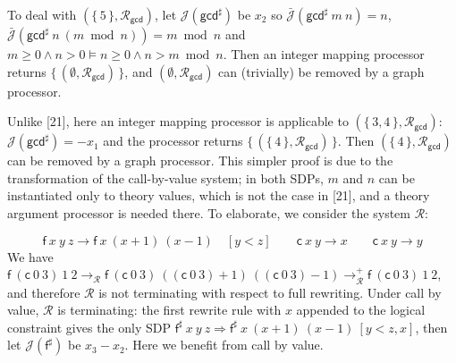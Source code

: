  
 
 
To deal with $(\{\,\text{5}\,\},\mathcal{R}_{\mathsf{gcd}})$, let $\mathcal{J}(\mathsf{gcd}^{\sharp})$ be $x_{2}$ so $\bar{\mathcal{J}}({{\mathsf{gcd}^{\sharp}}\ {m}}\ {n})=n$, $\bar{\mathcal{J}}({{\mathsf{gcd}^{\sharp}}\ {n}}\ {(m\bmod n)})=m\bmod n$ and $m\geq 0\wedge n>0\models n\geq 0\wedge n>m\bmod n$. Then an integer mapping processor returns $\{\,(\emptyset,\mathcal{R}_{\mathsf{gcd}})\,\}$, and $(\emptyset,\mathcal{R}_{\mathsf{gcd}})$ can (trivially) be removed by a graph processor.\par
 
 
 
Unlike [21], here an integer mapping processor is applicable to $(\{\,\text{3},\text{4}\,\},\mathcal{R}_{\mathsf{gcd}})$: $\mathcal{J}(\mathsf{gcd}^{\sharp})={-x_{1}}$ and the processor returns $\{\,(\{\,\text{4}\,\},\mathcal{R}_{\mathsf{gcd}})\,\}$. Then $(\{\,\text{4}\,\},\mathcal{R}_{\mathsf{gcd}})$ can be removed by a graph processor. This simpler proof is due to the transformation of the call-by-value system; in both SDPs, $m$ and $n$ can be instantiated only to theory values, which is not the case in [21], and a theory argument processor is needed there. To elaborate, we consider the system $\mathcal{R}$:\par
    \[{{{\mathsf{f}}\ {x}}\ {y}}\ {z}\rightarrow{{{\mathsf{f}}\ {x}}\ {(x+1)}}\ {(x-1)}\quad[y<z]\qquad{{\mathsf{c}}\ {x}}\ {y}\rightarrow x\qquad{{\mathsf{c}}\ {x}}\ {y}\rightarrow y\]    
We have ${{{\mathsf{f}}\ {({{\mathsf{c}}\ {0}}\ {3})}}\ {1}}\ {2}\rightarrow_{\mathcal{R}}{{{\mathsf{f}}\ {({{\mathsf{c}}\ {0}}\ {3})}}\ {(({{\mathsf{c}}\ {0}}\ {3})+1)}}\ {(({{\mathsf{c}}\ {0}}\ {3})-1)}\rightarrow_{\mathcal{R}}^{+}{{{\mathsf{f}}\ {({{\mathsf{c}}\ {0}}\ {3})}}\ {1}}\ {2}$, and therefore $\mathcal{R}$ is not terminating with respect to full rewriting. Under call by value, $\mathcal{R}$ is terminating: the first rewrite rule with $x$ appended to the logical constraint gives the only SDP ${{{{\mathsf{f}^{\sharp}}\ {x}}\ {y}}\ {z}}\Rightarrow{{{{\mathsf{f}^{\sharp}}\ {x}}\ {(x+1)}}\ {(x-1)}}\ [y<z,x]$, then let $\mathcal{J}(\mathsf{f}^{\sharp})$ be $x_{3}-x_{2}$. Here we benefit from call by value.\par
 
 
